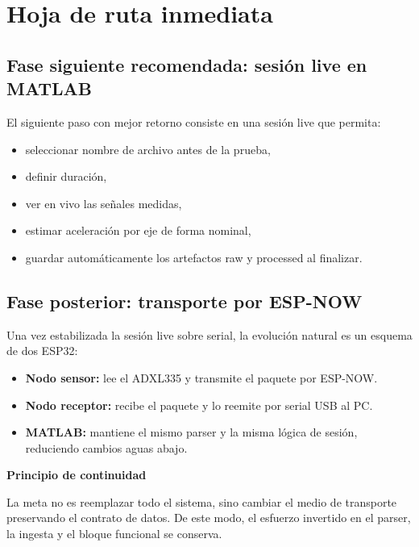 \documentclass[11pt,a4paper]{article}
\begin{document}
\section{Hoja de ruta inmediata}

\subsection{Fase siguiente recomendada: sesión live en MATLAB}

El siguiente paso con mejor retorno consiste en una sesión live que permita:

\begin{itemize}
  \item seleccionar nombre de archivo antes de la prueba,
  \item definir duración,
  \item ver en vivo las señales medidas,
  \item estimar aceleración por eje de forma nominal,
  \item guardar automáticamente los artefactos raw y processed al finalizar.
\end{itemize}

\subsection{Fase posterior: transporte por ESP-NOW}

Una vez estabilizada la sesión live sobre serial, la evolución natural es un esquema de dos ESP32:

\begin{itemize}
  \item \textbf{Nodo sensor:} lee el ADXL335 y transmite el paquete por ESP-NOW.
  \item \textbf{Nodo receptor:} recibe el paquete y lo reemite por serial USB al PC.
  \item \textbf{MATLAB:} mantiene el mismo parser y la misma lógica de sesión, reduciendo cambios aguas abajo.
\end{itemize}

\begin{roadmapbox}
\textbf{Principio de continuidad}\par
La meta no es reemplazar todo el sistema, sino cambiar el medio de transporte preservando el contrato de datos. De este modo, el esfuerzo invertido en el parser, la ingesta y el bloque funcional se conserva.
\end{roadmapbox}
\end{document}

